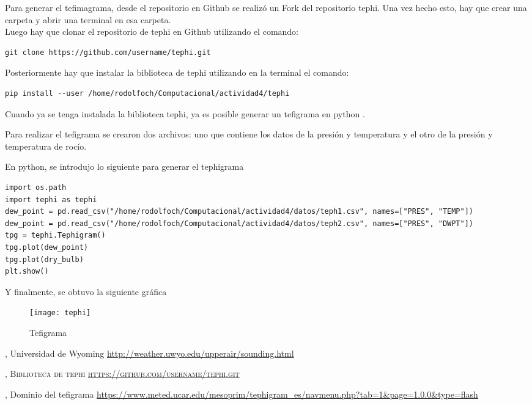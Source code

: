 \documentclass[12pt]{article}
\begin{document}
Para generar el tefimagrama, desde el repositorio en Github se realizó un Fork del repositorio tephi.
Una vez hecho esto, hay que crear una carpeta y abrir una terminal en esa carpeta. \\Luego hay que clonar el repositorio de tephi en Github utilizando el comando: 

\begin{verbatim}
git clone https://github.com/username/tephi.git
\end{verbatim}

Posteriormente hay que instalar la biblioteca de tephi utilizando en la terminal el comando:

\begin{verbatim}
pip install --user /home/rodolfoch/Computacional/actividad4/tephi
\end{verbatim}

Cuando ya se tenga instalada la biblioteca tephi, ya es posible generar un tefigrama en python .

Para realizar el tefigrama se crearon dos archivos: uno que contiene los datos de la presión y temperatura y el otro de la presión y temperatura de rocío.

En python, se introdujo lo siguiente para generar el tephigrama 

\begin{verbatim}
import os.path 
import tephi as tephi
dew_point = pd.read_csv("/home/rodolfoch/Computacional/actividad4/datos/teph1.csv", names=["PRES", "TEMP"])
dew_point = pd.read_csv("/home/rodolfoch/Computacional/actividad4/datos/teph2.csv", names=["PRES", "DWPT"])
tpg = tephi.Tephigram()
tpg.plot(dew_point)
tpg.plot(dry_bulb)
plt.show()
\end{verbatim}
Y finalmente, se obtuvo la siguiente gráfica 
\begin{figure}[ht]
\texttt{[image: tephi]}
\centering
\caption{Tefigrama}
\end{figure}

\newpage

\renewcommand{\refname}{\section*{Bibliografía}}
\begin{thebibliography}{9}
, \textsc Universidad de Wyoming {\url{http://weather.uwyo.edu/upperair/sounding.html}}



, \textsc{Biblioteca de tephi       \url{ https://github.com/username/tephi.git}}

, \textsc Dominio del tefigrama {\url{https://www.meted.ucar.edu/mesoprim/tephigram_es/navmenu.php?tab=1&page=1.0.0&type=flash}}


\end{thebibliography}
\end{document}
